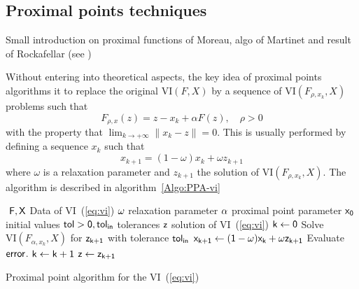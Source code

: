 \subsection{Proximal points techniques}

\begin{ndrva}
  Small introduction on proximal functions of Moreau, algo of Martinet
  and result of Rockafellar (see \cite{Chen.Teboublle_SIOPT1993})
\end{ndrva}

Without entering into theoretical aspects, the key idea of proximal points algorithms it to replace the original $\mathrm{VI}(F,X)$ by a sequence of $\mathrm{VI}(F_{\rho,x_k},X)$  problems such that 
\begin{equation}
  \label{eq:prox-algo-1}
  F_{\rho,x}(z) = z - x_k+ \alpha F(z) , \quad \rho > 0 
\end{equation}
with the property that $\lim_{ k \rightarrow +\infty} \| x_k -z \| = 0$. This is usually performed by defining a sequence $x_k$ such that
\begin{equation}
  \label{eq:prox-algo-2}
  x_{k+1} = (1-\omega) x_{k} + \omega z_{k+1}
\end{equation}
where $\omega$ is a relaxation parameter and $z_{k+1}$ the solution of $\mathrm{VI}(F_{\rho,x_k},X)$. The algorithm is described in algorithm~\ref{Algo:PPA-vi}
\begin{algorithm}
  \begin{algorithmic}
    {\sf
      \STATE $ $
      \REQUIRE $\sf F,X$ Data of VI~(\ref{eq:vi})
      \REQUIRE $\sf \omega$ relaxation parameter
      \REQUIRE $\sf \alpha$ proximal point parameter
      \REQUIRE $\sf x_0$ initial values
      \REQUIRE $\sf tol >0, tol_{in}$ tolerances
      \ENSURE  $\sf z$ solution of VI~(\ref{eq:vi})
      \STATE   $\sf k \leftarrow 0$ 
      \STATE Solve $\mathrm{VI}(F_{\alpha,x_k},X)$ for $\sf z_{k+1}$ with tolerance $\sf tol_{in}$
      \STATE $\sf x_{k+1} \leftarrow (1-\omega) x_{k} + \omega z_{k+1}$
      \STATE Evaluate $\sf error$.
      \STATE $\sf k \leftarrow k+1$
      \ENDWHILE
      \STATE $\sf z \leftarrow z_{k+1}$ 
    }
  \end{algorithmic}
  \caption{Proximal point algorithm for the VI~(\ref{eq:vi})}  \label{Algo:PPA-vi}
\end{algorithm}

